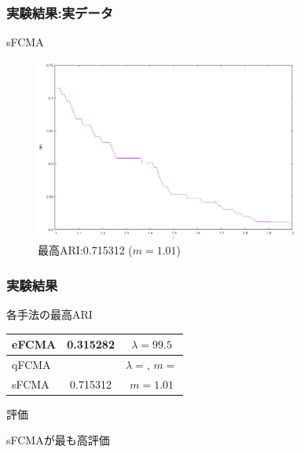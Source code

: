 \documentclass[13pt,dvipdfmx]{beamer}
\begin{document}
\begin{frame}\frametitle{実験結果:実データ}
  \begin{block}{sFCMA}
    \begin{figure}[htbp]
      \begin{center}
        \includegraphics[height=60mm]{sfcma_ARI.png}
      \end{center}
      \captionsetup{labelformat=empty,labelsep=none}
      \caption{最高ARI:0.715312 ($m=1.01$)}
    \end{figure}
  \end{block}
\end{frame}

\begin{frame}\frametitle{実験結果}
  \begin{block}{各手法の最高ARI}
    \vspace{5mm}
    \begin{table}[htb]
      \begin{tabular}{ l || c | c }\hline
        eFCMA & 0.315282 & $\lambda = 99.5$\\ \hline  
        qFCMA &  & $\lambda = $\;, \;$m = $\\  \hline
        sFCMA & 0.715312 & $m = 1.01$\\ \hline
      \end{tabular}
    \end{table}
  \end{block}
  \begin{block}{評価}
    \begin{center}
      sFCMAが最も高評価
    \end{center}
  \end{block}
\end{frame}
\end{document}
